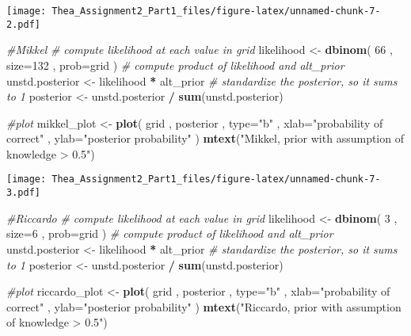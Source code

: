 \documentclass[]{article}
\newenvironment{Shaded}{\begin{snugshade}}{\end{snugshade}}
\newcommand{\KeywordTok}[1]{\textcolor[rgb]{0.13,0.29,0.53}{\textbf{#1}}}
\newcommand{\DataTypeTok}[1]{\textcolor[rgb]{0.13,0.29,0.53}{#1}}
\newcommand{\DecValTok}[1]{\textcolor[rgb]{0.00,0.00,0.81}{#1}}
\newcommand{\StringTok}[1]{\textcolor[rgb]{0.31,0.60,0.02}{#1}}
\newcommand{\CommentTok}[1]{\textcolor[rgb]{0.56,0.35,0.01}{\textit{#1}}}
\newcommand{\OperatorTok}[1]{\textcolor[rgb]{0.81,0.36,0.00}{\textbf{#1}}}
\newcommand{\NormalTok}[1]{#1}
\begin{document}
\texttt{[image: Thea\_Assignment2\_Part1\_files/figure-latex/unnamed-chunk-7-2.pdf]}

\begin{Shaded}
\begin{Highlighting}[]
\CommentTok{#Mikkel}
\CommentTok{# compute likelihood at each value in grid}
\NormalTok{likelihood <-}\StringTok{ }\KeywordTok{dbinom}\NormalTok{( }\DecValTok{66}\NormalTok{ , }\DataTypeTok{size=}\DecValTok{132}\NormalTok{ , }\DataTypeTok{prob=}\NormalTok{grid )}
\CommentTok{# compute product of likelihood and alt_prior}
\NormalTok{unstd.posterior <-}\StringTok{ }\NormalTok{likelihood }\OperatorTok{*}\StringTok{ }\NormalTok{alt_prior}
\CommentTok{# standardize the posterior, so it sums to 1}
\NormalTok{posterior <-}\StringTok{ }\NormalTok{unstd.posterior }\OperatorTok{/}\StringTok{ }\KeywordTok{sum}\NormalTok{(unstd.posterior)}

\CommentTok{#plot}
\NormalTok{mikkel_plot <-}\StringTok{ }\KeywordTok{plot}\NormalTok{( grid , posterior , }\DataTypeTok{type=}\StringTok{"b"}\NormalTok{ ,}
    \DataTypeTok{xlab=}\StringTok{"probability of correct"}\NormalTok{ , }\DataTypeTok{ylab=}\StringTok{"posterior probability"}\NormalTok{ )}
\KeywordTok{mtext}\NormalTok{(}\StringTok{"Mikkel, prior with assumption of knowledge > 0.5"}\NormalTok{)}
\end{Highlighting}
\end{Shaded}

\texttt{[image: Thea\_Assignment2\_Part1\_files/figure-latex/unnamed-chunk-7-3.pdf]}

\begin{Shaded}
\begin{Highlighting}[]
\CommentTok{#Riccardo}
\CommentTok{# compute likelihood at each value in grid}
\NormalTok{likelihood <-}\StringTok{ }\KeywordTok{dbinom}\NormalTok{( }\DecValTok{3}\NormalTok{ , }\DataTypeTok{size=}\DecValTok{6}\NormalTok{ , }\DataTypeTok{prob=}\NormalTok{grid )}
\CommentTok{# compute product of likelihood and alt_prior}
\NormalTok{unstd.posterior <-}\StringTok{ }\NormalTok{likelihood }\OperatorTok{*}\StringTok{ }\NormalTok{alt_prior}
\CommentTok{# standardize the posterior, so it sums to 1}
\NormalTok{posterior <-}\StringTok{ }\NormalTok{unstd.posterior }\OperatorTok{/}\StringTok{ }\KeywordTok{sum}\NormalTok{(unstd.posterior)}

\CommentTok{#plot}
\NormalTok{riccardo_plot <-}\StringTok{ }\KeywordTok{plot}\NormalTok{( grid , posterior , }\DataTypeTok{type=}\StringTok{"b"}\NormalTok{ ,}
    \DataTypeTok{xlab=}\StringTok{"probability of correct"}\NormalTok{ , }\DataTypeTok{ylab=}\StringTok{"posterior probability"}\NormalTok{ )}
\KeywordTok{mtext}\NormalTok{(}\StringTok{"Riccardo, prior with assumption of knowledge > 0.5"}\NormalTok{)}
\end{Highlighting}
\end{Shaded}
\end{document}
